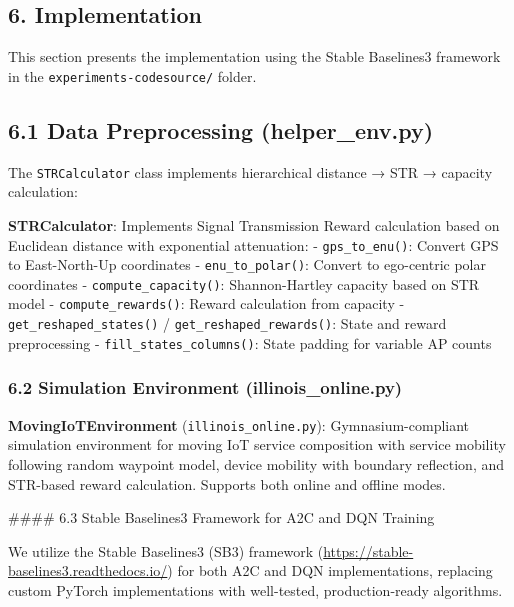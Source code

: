 \subsection{6. Implementation}\label{implementation}

This section presents the implementation using the Stable Baselines3
framework in the \texttt{experiments-codesource/} folder.

\hypertarget{data-preprocessing-helper_env.py}{%
	\subsection{6.1 Data Preprocessing (helper\_env.py)}\label{data-preprocessing-helper_env.py}}

The \texttt{STRCalculator} class implements hierarchical distance → STR
→ capacity calculation:

\textbf{STRCalculator}: Implements Signal Transmission Reward
calculation based on Euclidean distance with exponential attenuation: -
\texttt{gps\_to\_enu()}: Convert GPS to East-North-Up coordinates -
\texttt{enu\_to\_polar()}: Convert to ego-centric polar coordinates -
\texttt{compute\_capacity()}: Shannon-Hartley capacity based on STR
model - \texttt{compute\_rewards()}: Reward calculation from capacity -
\texttt{get\_reshaped\_states()} / \texttt{get\_reshaped\_rewards()}:
State and reward preprocessing - \texttt{fill\_states\_columns()}: State
padding for variable AP counts

\hypertarget{simulation-environment-illinois_online.py}{%
	\subsubsection{6.2 Simulation Environment
		(illinois\_online.py)}\label{simulation-environment-illinois_online.py}}

\textbf{MovingIoTEnvironment} (\texttt{illinois\_online.py}):
Gymnasium-compliant simulation environment for moving IoT service
composition with service mobility following random waypoint model,
device mobility with boundary reflection, and STR-based reward
calculation. Supports both online and offline modes.

\hypertarget{stable-baselines3-framework-for-a2c-and-dqn-training}{%
	#### 6.3 Stable Baselines3 Framework for A2C and DQN Training
}\label{stable-baselines3-framework-for-a2c-and-dqn-training}

We utilize the Stable Baselines3 (SB3) framework
(\url{https://stable-baselines3.readthedocs.io/}) for both A2C and DQN
implementations, replacing custom PyTorch implementations with
well-tested, production-ready algorithms.

